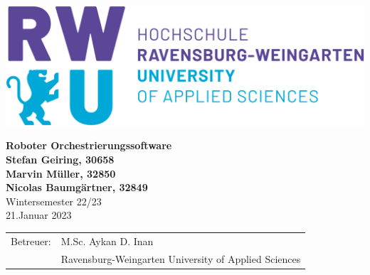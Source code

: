 \pagestyle{empty}



\begin{center}


\vspace*{2cm}
\includegraphics[scale=0.15]{imgs/rwu_logo.png}
\vspace*{3cm}

\huge
\textbf{Roboter Orchestrierungssoftware}\\
\Large
\vspace*{2cm}
\noindent \textbf{Stefan Geiring, 30658}\\
\noindent \textbf{Marvin Müller, 32850}\\
\noindent \textbf{Nicolas Baumgärtner, 32849}\\
\vspace*{0.5cm}
Wintersemester 22/23\\
\normalsize 
21.Januar 2023
\vspace*{2cm}
\end{center}


\vspace*{6.5cm}
\begin{tabular}{ll}
Betreuer: & M.Sc. Aykan D. Inan \\
 & Ravensburg-Weingarten University of Applied Sciences\\
\end{tabular}

